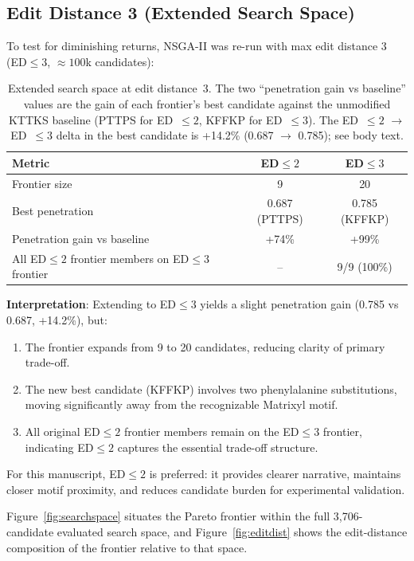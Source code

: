 \documentclass[11pt,letterpaper]{article}
\begin{document}
\subsection{Edit Distance 3 (Extended Search Space)}

To test for diminishing returns, NSGA-II was re-run with max edit distance 3 (ED$\leq 3$, $\approx 100$k candidates):

\begin{table}[H]
\centering
\small
\begin{tabular}{lcc}
\toprule
\textbf{Metric} & \textbf{ED$\leq 2$} & \textbf{ED$\leq 3$} \\
\midrule
Frontier size & 9 & 20 \\
Best penetration & 0.687 (PTTPS) & 0.785 (KFFKP) \\
Penetration gain vs baseline & +74\% & +99\% \\
All ED$\leq 2$ frontier members on ED$\leq 3$ frontier & -- & 9/9 (100\%) \\
\bottomrule
\end{tabular}
\caption{Extended search space at edit distance~3. The two ``penetration gain vs baseline'' values are the gain of each frontier's best candidate against the unmodified KTTKS baseline (PTTPS for ED~$\leq 2$, KFFKP for ED~$\leq 3$). The ED~$\leq 2$ $\to$ ED~$\leq 3$ delta in the best candidate is +14.2\% (0.687 $\to$ 0.785); see body text.}
\label{tab:ed3}
\end{table}

\textbf{Interpretation}: Extending to ED$\leq 3$ yields a slight penetration gain (0.785 vs 0.687, +14.2\%), but:
\begin{enumerate}
  \item The frontier expands from 9 to 20 candidates, reducing clarity of primary trade-off.
  \item The new best candidate (KFFKP) involves two phenylalanine substitutions, moving significantly away from the recognizable Matrixyl motif.
  \item All original ED$\leq 2$ frontier members remain on the ED$\leq 3$ frontier, indicating ED$\leq 2$ captures the essential trade-off structure.
\end{enumerate}

For this manuscript, ED$\leq 2$ is preferred: it provides clearer narrative, maintains closer motif proximity, and reduces candidate burden for experimental validation.

Figure~\ref{fig:searchspace} situates the Pareto frontier within the full 3,706-candidate evaluated search space, and Figure~\ref{fig:editdist} shows the edit-distance composition of the frontier relative to that space.
\end{document}
